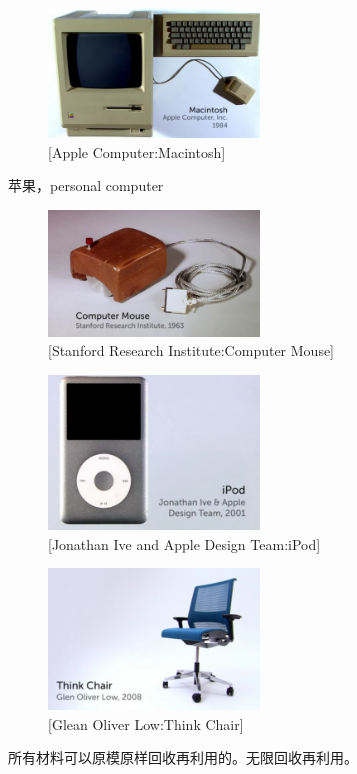 \documentclass[UTF8]{../../../../RepresentationUniverse}
\begin{document}
\begin{figure}[h]
    \centering
    \includegraphics[width=0.5\textwidth]{./src/figures/Macintosh_2023-04-09_21-53-44.png}
    \caption{[Apple Computer:Macintosh]}
    \label{figure:Macintosh}
\end{figure}
苹果，personal computer


\begin{figure}[h]
    \centering
    \includegraphics[width=0.5\textwidth]{./src/figures/Computer Mouse_2023-04-09_21-56-05.png}
    \caption{[Stanford Research Institute:Computer Mouse]}
    \label{figure:Computer Mouse}
\end{figure}


\begin{figure}[h]
    \centering
    \includegraphics[width=0.5\textwidth]{./src/figures/iPod_2023-04-09_21-59-02.png}
    \caption{[Jonathan Ive and Apple Design Team:iPod]}
    \label{figure:iPod}
\end{figure}


\begin{figure}[h]
    \centering
    \includegraphics[width=0.5\textwidth]{./src/figures/Think Chair_2023-04-09_22-02-24.png}
    \caption{[Glean Oliver Low:Think Chair]}
    \label{figure:Think Chair}
\end{figure}
所有材料可以原模原样回收再利用的。无限回收再利用。
\end{document}
